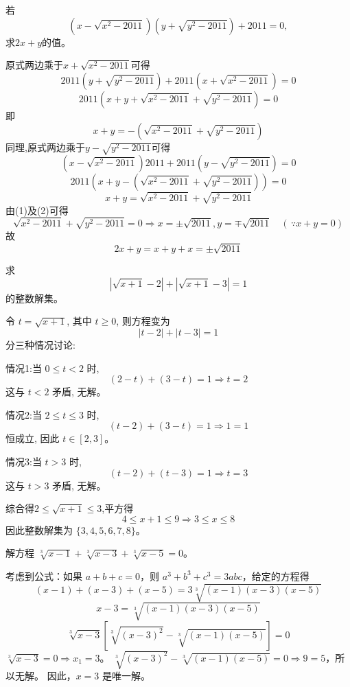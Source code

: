 \begin{questions}
    \question 若
    \[
    (x-\sqrt{x^2-2011})(y+\sqrt{y^2-2011})+2011=0,
    \]
    求$2x+y$的值。
    \begin{solution}
        原式两边乘于$x+\sqrt{x^2-2011}$可得
        \[
        2011(y+ \sqrt{y^2-2011})+2011(x+\sqrt{x^2-2011})=0
        \]
        \[
        2011(x+y+\sqrt{x^2-2011} +\sqrt{y^2-2011})=0
        \]
        即
        \[
        x+y= -(\sqrt{x^2-2011} +\sqrt{y^2-2011}) \tag{1}
        \]
        同理,原式两边乘于$y-\sqrt{y^2-2011}$可得 
        \[
        (x-\sqrt{x^2-2011})2011+ 2011(y-\sqrt{y^2-2011})=0 
        \]
        \[
        2011(x+y-(\sqrt{x^2-2011}+ \sqrt{y^2-2011})) =0 
        \]
        \[
        x+y=\sqrt{x^2-2011}+ \sqrt{y^2-2011} \tag{2}
        \]
        由(1)及(2)可得
        \[
        \sqrt{x^2-2011}+ \sqrt{y^2-2011}=0 \Rightarrow x=\pm \sqrt{2011},y=\mp \sqrt{2011}\quad (\,\because x+y=0)
        \]
        故\[
        2x+y=x+y+x= \pm \sqrt{2011}
        \]
    \end{solution}

    \question 求 
    \[
    \left|\sqrt{x + 1} - 2\right| + \left|\sqrt{x + 1} - 3\right| = 1
    \]
    的整数解集。
    \begin{solution}
        令 $t = \sqrt{x+1}$, 其中 $t \geq 0$, 则方程变为
        \[
        |t-2| + |t-3| = 1
        \]
        分三种情况讨论:

        情况1:当 $0 \leq t < 2$ 时,
        \[
        (2-t) + (3-t) = 1 \Rightarrow t = 2
        \]
        这与 $t < 2$ 矛盾, 无解。

        情况2:当 $2 \leq t \leq 3$ 时,
        \[
        (t-2) + (3-t) = 1 \Rightarrow 1 = 1
        \]
        恒成立, 因此 $t \in [2, 3]$。

        情况3:当 $t > 3$ 时,
        \[
        (t-2) + (t-3) = 1 \Rightarrow t = 3
        \]
        这与 $t > 3$ 矛盾, 无解。

        综合得$2 \leq \sqrt{x+1} \leq 3$,平方得
        \[
        4 \leq x+1 \leq 9 \Rightarrow 3 \leq x \leq 8
        \]
        因此整数解集为 $\{3, 4, 5, 6, 7, 8\}$。
    \end{solution}

    \question
解方程 $\sqrt[3]{x-1}+\sqrt[3]{x-3}+\sqrt[3]{x-5}=0$。
\begin{solution}
考虑到公式：如果 $a+b+c=0$，则 $a^3+b^3+c^3=3abc$，给定的方程得
\[
(x-1)+(x-3)+(x-5)=3\sqrt[3]{(x-1)(x-3)(x-5)}
\]
\[
x-3=\sqrt[3]{(x-1)(x-3)(x-5)}
\]
\[
\sqrt[3]{x-3}\left[\sqrt[3]{(x-3)^2}-\sqrt[3]{(x-1)(x-5)}\right]=0
\]
$\sqrt[3]{x-3}=0 \Rightarrow x_1=3$。
$\sqrt[3]{(x-3)^2}-\sqrt[3]{(x-1)(x-5)}=0 \Rightarrow 9=5$，所以无解。
因此，$x=3$ 是唯一解。
\end{solution}


\end{questions}
